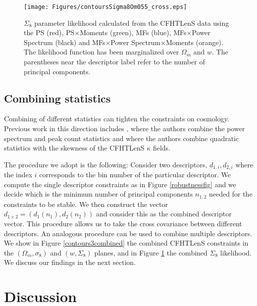 \documentclass[reprint,aps,prd,superscriptaddress,showkeys,showpacs]{revtex4-1}
\begin{document}
\begin{figure}
\begin{center}
\texttt{[image: Figures/contoursSigma8Om055\_cross.eps]}
\end{center}
\caption{$\Sigma_8$ parameter likelihood calculated from the CFHTLenS data using the PS (red), PS$\times$Moments (green), MFs (blue), MFs$\times$Power Spectrum (black) and MFs$\times$Power Spectrum$\times$Moments (orange). The likelihood function has been marginalized over $\Omega_m$ and $w$. The parentheses near the descriptor label refer to the number of principal components.}
\label{likelihoodSi8cross}
\end{figure}

\subsection{Combining statistics}
Combining of different statistics can tighten the constraints on cosmology. Previous work in this direction includes \citep{Companion}, where the authors combine the power spectrum and peak count statistics and  \citep{CFHTFu} where the authors combine quadratic statistics with the skewness of the CFHTLenS $\kappa$ fields. 

The procedure we adopt is the following:  Consider two descriptors, $d_{1,i},d_{2,i}$ where the index $i$ corresponds to the bin number of the particular descriptor. We compute the single descriptor constraints as in Figure \ref{robustnessfig} and we decide which is the minimum number of principal components $n_{1,2}$ needed for the constraints to be stable. We then construct the vector $d_{1\times2} = (d_1(n_1),d_2(n_2))$ and consider this as the combined descriptor vector. This procedure allows us to take the cross covariance between different descriptors. An analogous procedure can be used to combine multiple descriptors. We show in Figure \ref{contours3combined} the combined CFHTLenS constraints in the $(\Omega_m,\sigma_8)$ and $(w,\Sigma_8)$ planes, and in Figure \ref{likelihoodSi8cross} the combined $\Sigma_8$ likelihood. We discuss our findings in the next section. 



\section{Discussion}
\label{discussion}
\end{document}
